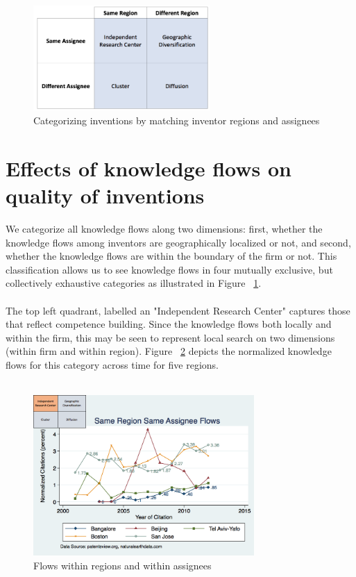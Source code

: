 \documentclass[12pt]{article}
\begin{document}
\begin{figure}[h]
\begin{centering}
  \includegraphics[width=0.6\textwidth]{2x2}
  \caption{Categorizing inventions by matching inventor regions and assignees}
  \label{fig:2x2}
\end{centering}
\end{figure}

\section*{Effects of knowledge flows on quality of inventions}
We categorize all knowledge flows along two dimensions:  first, whether the knowledge flows among inventors are geographically localized or not, and second, whether the knowledge flows are within the boundary of the firm or not. This classification allows us to see knowledge flows in four mutually exclusive, but collectively exhaustive categories as illustrated in Figure ~\ref{fig:2x2}. 
\\\\
The top left quadrant, labelled an "Independent Research Center" captures those that reflect competence building. Since the knowledge flows both locally and within the firm, this may be seen to represent local search on two dimensions (within firm and within region).  Figure ~\ref{fig:SMSSameRegionSameAssigneeFlows} depicts the normalized knowledge flows for this category across time for five regions. 
\\\\
\begin{figure}[h]
\begin{centering}
  \includegraphics[width=0.75\textwidth]{SMSSameRegionSameAssigneeFlows}
  \caption{Flows within regions and within assignees}
  \label{fig:SMSSameRegionSameAssigneeFlows}
\end{centering}
\end{figure}
\end{document}
